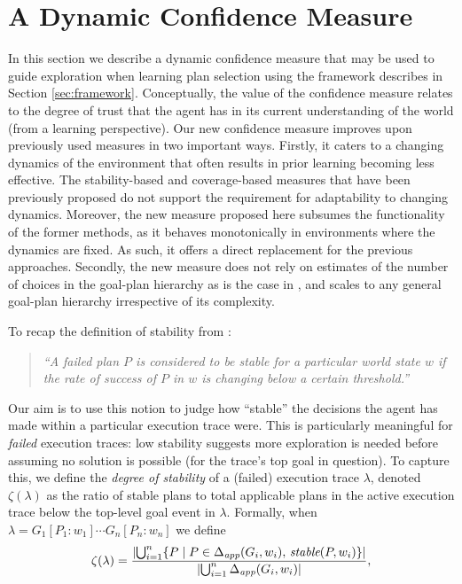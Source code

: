 


\section{A Dynamic Confidence Measure}\label{sec:confidence}

In this section we describe a dynamic confidence measure that may be used to guide exploration when learning plan selection using the framework describes in Section \ref{sec:framework}. Conceptually, the value of the confidence measure relates to the degree of trust that the agent has in its current understanding of the world (from a learning perspective). Our new confidence measure improves upon previously used measures in two important ways. 
%
Firstly, it caters to a changing dynamics of the environment that often results in prior learning becoming less effective. The stability-based \cite{airiau09:enhancing} and coverage-based \cite{singh10:extending,singh10:learning} measures that have been previously proposed do not support the requirement for adaptability to changing dynamics. Moreover, the new measure proposed here subsumes the functionality of the former methods, as it behaves monotonically in environments where the dynamics are fixed. As such, it offers a direct replacement for the previous approaches. 
%
Secondly, the new measure does not rely on estimates of the number of choices in the goal-plan hierarchy as is the case in \cite{singh10:extending,singh10:learning}, and scales to any general goal-plan hierarchy irrespective of its complexity.


To recap the definition of stability from \cite{singh10:learning}:

\begin{quote}
\emph{``A failed plan $P$ is considered to be stable for a particular world state $w$ if the rate of success of $P$ in $w$ is changing below a certain threshold.''}
\end{quote} 

\newcommand{\ds}{\zeta}
\newcommand{\app}{\mathname{app}}
\newcommand{\stable}{\mathname{stable}}

Our aim is to use this notion to judge how ``stable'' the decisions the agent has made within a particular execution trace were. This is particularly meaningful for \emph{failed} execution traces: low stability suggests more exploration is needed before assuming no solution is possible (for the trace's top goal in question).
To capture this, we define the \emph{degree of stability} of a (failed) execution trace $\lambda$, denoted $\ds(\lambda)$ as the ratio of stable plans to total applicable plans in the active execution trace below the top-level goal event in $\lambda$. Formally, when $\lambda= G_1[P_1:w_1] \cdots G_n[P_n:w_n]$ we define 
\[
\ds(\lambda) = 
	\frac{ 
			\card{ \bigcup_{i=1}^n \set{P \mid P \in \Delta_{\app}(G_i,w_i),\, \stable(P,w_i)} } 
		}
		{
			\card{	\bigcup_{i=1}^n \Delta_{\app}(G_i,w_i) } 
		},
\]

